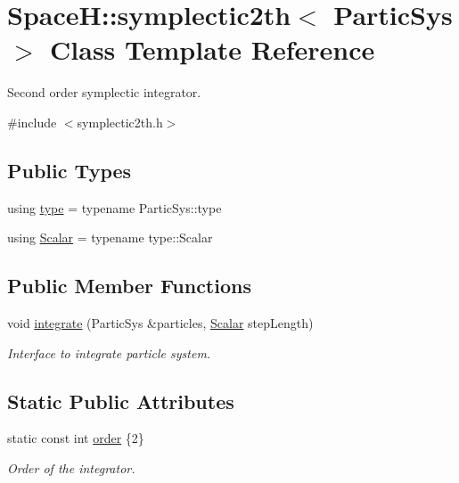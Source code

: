 \hypertarget{class_space_h_1_1symplectic2th}{}\section{SpaceH\+:\+:symplectic2th$<$ Partic\+Sys $>$ Class Template Reference}
\label{class_space_h_1_1symplectic2th}


Second order symplectic integrator.  




{\ttfamily \#include $<$symplectic2th.\+h$>$}

\subsection*{Public Types}
\begin{DoxyCompactItemize}
\item 
using \mbox{\hyperlink{class_space_h_1_1symplectic2th_a37bb3e82a496cf7e4ca61d0dcb1f0001}{type}} = typename Partic\+Sys\+::type
\item 
using \mbox{\hyperlink{class_space_h_1_1symplectic2th_a744708fc201c6970effe4d0b011973e9}{Scalar}} = typename type\+::\+Scalar
\end{DoxyCompactItemize}
\subsection*{Public Member Functions}
\begin{DoxyCompactItemize}
\item 
void \mbox{\hyperlink{class_space_h_1_1symplectic2th_a966295cb14c383d9ae1d1d99840f7613}{integrate}} (Partic\+Sys \&particles, \mbox{\hyperlink{class_space_h_1_1symplectic2th_a744708fc201c6970effe4d0b011973e9}{Scalar}} step\+Length)
\begin{DoxyCompactList}\small\item\em Interface to integrate particle system. \end{DoxyCompactList}\end{DoxyCompactItemize}
\subsection*{Static Public Attributes}
\begin{DoxyCompactItemize}
\item 
static const int \mbox{\hyperlink{class_space_h_1_1symplectic2th_a49d477ddc7a7009d5f4dfc1d88f2e52b}{order}} \{2\}
\begin{DoxyCompactList}\small\item\em Order of the integrator. \end{DoxyCompactList}\end{DoxyCompactItemize}


